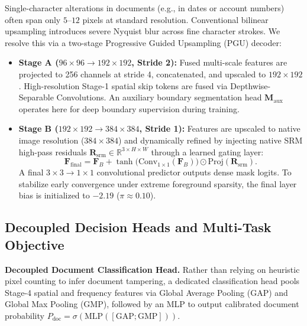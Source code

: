 \documentclass[10pt,twocolumn,letterpaper]{article}
\begin{document}
Single-character alterations in documents (e.g., in dates or account numbers) often span only $5$--$12$ pixels at standard resolution. Conventional bilinear upsampling introduces severe Nyquist blur across fine character strokes. We resolve this via a two-stage Progressive Guided Upsampling (PGU) decoder:
\begin{itemize}
    \item \textbf{Stage A ($96 \times 96 \to 192 \times 192$, Stride 2):} Fused multi-scale features are projected to 256 channels at stride 4, concatenated, and upscaled to $192 \times 192$. High-resolution Stage-1 spatial skip tokens are fused via Depthwise-Separable Convolutions. An auxiliary boundary segmentation head $\mathbf{M}_{\text{aux}}$ operates here for deep boundary supervision during training.
    \item \textbf{Stage B ($192 \times 192 \to 384 \times 384$, Stride 1):} Features are upscaled to native image resolution ($384 \times 384$) and dynamically refined by injecting native SRM high-pass residuals $\mathbf{R}_{\text{srm}} \in \mathbb{R}^{3 \times H \times W}$ through a learned gating layer:
    \begin{equation}
        \mathbf{F}_{\text{final}} = \mathbf{F}_B + \tanh\Big(\text{Conv}_{1 \times 1}(\mathbf{F}_B)\Big) \odot \text{Proj}(\mathbf{R}_{\text{srm}}).
    \end{equation}
    A final $3 \times 3 \to 1 \times 1$ convolutional predictor outputs dense mask logits. To stabilize early convergence under extreme foreground sparsity, the final layer bias is initialized to $-2.19$ ($\pi \approx 0.10$).
\end{itemize}

\subsection{Decoupled Decision Heads and Multi-Task Objective}
\label{subsec:heads_and_loss}

\noindent\textbf{Decoupled Document Classification Head.} 
Rather than relying on heuristic pixel counting to infer document tampering, a dedicated classification head pools Stage-4 spatial and frequency features via Global Average Pooling (GAP) and Global Max Pooling (GMP), followed by an MLP to output calibrated document probability $P_{\text{doc}} = \sigma(\text{MLP}([\text{GAP}; \text{GMP}]))$.
\end{document}

